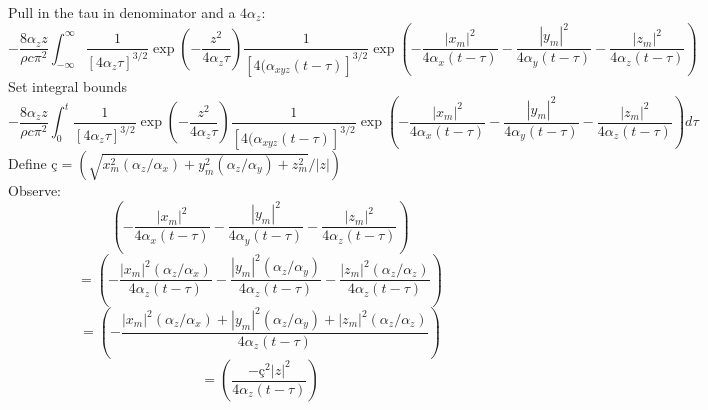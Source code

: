 \documentclass[letterpaper]{article}
\newcommand{\cedilla}{\text{\c{c}}}
\begin{document}
Pull in the tau in denominator and a $4 \alpha_{z}$: 
\begin{equation}
-\frac{8\alpha_{z}z}{\rho c\pi^{2}} \int_{-\infty}^{\infty}\frac{1}{\left[4\alpha_{z}\tau\right]^{3/2}}\exp\left(-\frac{z^{2}}{4\alpha_{z}\tau}\right)\frac{1}{\left[4(\alpha_{xyz}(t-\tau)\right]^{3/2}}\exp\left(-\frac{|x_{m}|^{2}}{4 \alpha_{x} (t-\tau)} -\frac{|y_{m}|^{2}}{4 \alpha_{y} (t-\tau)} -\frac{|z_{m}|^{2}}{4 \alpha_{z} (t-\tau)}\right)
\end{equation}
Set integral bounds
\begin{equation}
-\frac{8\alpha_{z}z}{\rho c\pi^{2}} \int_{0}^{t}\frac{1}{\left[4\alpha_{z}\tau\right]^{3/2}}\exp\left(-\frac{z^{2}}{4\alpha_{z}\tau}\right)\frac{1}{\left[4(\alpha_{xyz}(t-\tau)\right]^{3/2}}\exp\left(-\frac{|x_{m}|^{2}}{4 \alpha_{x} (t-\tau)} -\frac{|y_{m}|^{2}}{4 \alpha_{y} (t-\tau)} -\frac{|z_{m}|^{2}}{4 \alpha_{z} (t-\tau)}\right) d\tau
\end{equation}
Define $\cedilla=(\sqrt{x_{m}^{2}(\alpha_{z}/\alpha_{x})+y_{m}^{2}(\alpha_{z}/\alpha_{y})+z_{m}^{2}}/|z|)$
\\
Observe:
\begin{equation}
\left(-\frac{|x_{m}|^{2}}{4 \alpha_{x} (t-\tau)} -\frac{|y_{m}|^{2}}{4 \alpha_{y} (t-\tau)} -\frac{|z_{m}|^{2}}{4 \alpha_{z} (t-\tau)}\right)
\end{equation}
\begin{equation}
=\left(-\frac{|x_{m}|^{2}(\alpha_{z}/\alpha_{x})}{4 \alpha_{z} (t-\tau)} -\frac{|y_{m}|^{2}(\alpha_{z}/\alpha_{y})}{4 \alpha_{z} (t-\tau)} -\frac{|z_{m}|^{2}(\alpha_{z}/\alpha_{z})}{4 \alpha_{z} (t-\tau)}\right)
\end{equation}
\begin{equation}
=\left(-\frac{|x_{m}|^{2}(\alpha_{z}/\alpha_{x}) + |y_{m}|^{2}(\alpha_{z}/\alpha_{y}) + |z_{m}|^{2}(\alpha_{z}/\alpha_{z})}{4 \alpha_{z} (t-\tau)}\right)
\end{equation}
\begin{equation}
=\left(\frac{-\cedilla^{2} |z|^{2}}{4 \alpha_{z} (t-\tau)}\right)
\end{equation}
\end{document}
